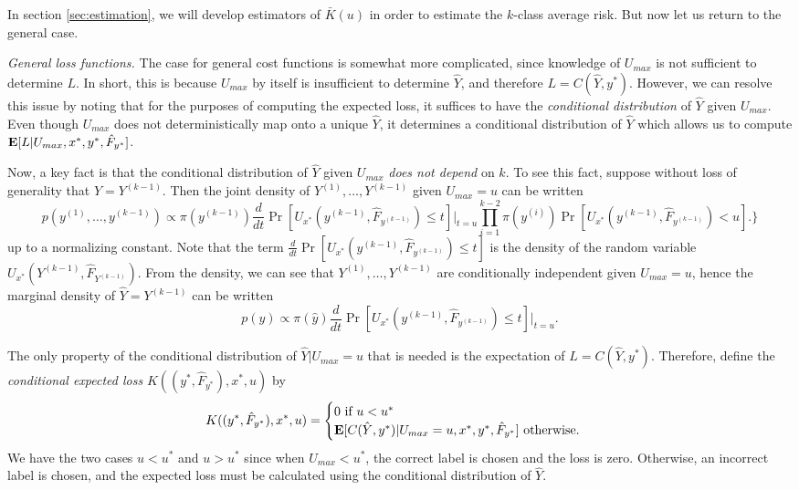 \documentclass[12pt]{article}
\begin{document}
In section \ref{sec:estimation}, we will develop estimators of
$\bar{K}(u)$ in order to estimate the $k$-class average risk.
But now let us return to the general case.
\newline

\noindent \emph{General loss functions.}
The case for general cost functions is somewhat more complicated,
since knowledge of $U_{max}$ is not sufficient to determine $L$.  In
short, this is because $U_{max}$ by itself is insufficient to
determine $\hat{Y}$, and therefore $L=C(\hat{Y}, y^*)$.  However, we
can resolve this issue by noting that for the purposes of computing
the expected loss, it suffices to have the \emph{conditional
distribution} of $\hat{Y}$ given $U_{max}$.  Even though $U_{max}$
does not deterministically map onto a unique $\hat{Y}$, it determines
a conditional distribution of $\hat{Y}$ which allows us to compute
$\textbf{E}[L|U_{max}, x^*, y^*, \hat{F}_{y^*}]$.

Now, a key fact is that the conditional distribution of $\hat{Y}$
given $U_{max}$ \emph{does not depend} on $k$.  To see this fact,
suppose without loss of generality that $\hat{Y} = Y^{(k-1)}.$ Then
the joint density of $Y^{(1)},\hdots, Y^{(k-1)}$ given $U_{max} =
u$ can be written
\[
p(y^{(1)},\hdots, y^{(k-1)}) \propto 
\pi(y^{(k-1)})\frac{d}{dt}\Pr[U_{x^*}(y^{(k-1)}, \hat{F}_{y^{(k-1)}}) \leq t]|_{t=u}
\prod_{i=1}^{k-2}\pi(y^{(i)})\Pr[U_{x^*}(y^{(k-1)}, \hat{F}_{y^{(k-1)}}) < u].
\}
\]
up to a normalizing constant.  Note that the term
$\frac{d}{dt}\Pr[U_{x^*}(y^{(k-1)}, \hat{F}_{y^{(k-1)}}) \leq t]$ is the
density of the random variable
$U_{x^*}(Y^{(k-1)}, \hat{F}_{Y^{(k-1)}})$. From the density, we can see
that $Y^{(1)},\hdots, Y^{(k-1)}$ are conditionally independent given
$U_{max} = u$, hence the marginal density of $\hat{Y}=Y^{(k-1)}$ can
be written
\[
p(\hat{y}) \propto \pi(\hat{y})\frac{d}{dt}\Pr[U_{x^*}(y^{(k-1)}, \hat{F}_{y^{(k-1)}}) \leq t]|_{t=u}.
\]

The only property of the conditional distribution of $\hat{Y}|U_{max} = u$ that is needed is
the expectation of $L = C(\hat{Y}, y^*)$.  Therefore, define the \emph{conditional expected loss} $K((y^*, \hat{F}_{y^*}), x^*, u)$ by
\begin{equation}\label{eq:Kfunc}
K((y^*, \hat{F}_{y^*}), x^*, u) = \begin{cases} 0 \text{ if } u < u^*\\
\textbf{E}[C(\hat{Y}, y^*)|U_{max} = u, x^*, y^*, \hat{F}_{y^*}] \text{ otherwise.}
\end{cases}
\end{equation}
We have the two cases $u < u^*$ and $u > u^*$ since when $U_{max} <
u^*$, the correct label is chosen and the loss is zero.  Otherwise, an
incorrect label is chosen, and the expected loss must be calculated
using the conditional distribution of $\hat{Y}$.
\end{document}
